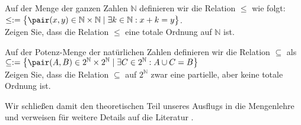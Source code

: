 \exercise
Auf der Menge der ganzen Zahlen $\mathbb{N}$ definieren wir die Relation $\leq$ 
wie folgt: 
\\[0.2cm]
\hspace*{1.3cm}
$\leq := \bigl\{ \pair(x,y) \in \mathbb{N} \times \mathbb{N} \mid \exists k \in \mathbb{N}: x + k = y \bigr\}$.
\\[0.2cm]
Zeigen Sie, dass die Relation $\leq$ eine totale Ordnung auf $\mathbb{N}$ ist.
\exend

\exercise
Auf der Potenz-Menge der nat\"{u}rlichen Zahlen definieren wir die Relation
$\subseteq$ als 
\\[0.2cm]
\hspace*{1.3cm}
$\subseteq := 
\bigl\{ \pair(A,B) \in 2^\mathbb{N} \times 2^\mathbb{N}\mid \exists C \in 2^\mathbb{N}: A \cup C = B \bigr\}$
\\[0.2cm]
Zeigen Sie, dass die Relation $\subseteq$ auf $2^\mathbb{N}$ zwar eine partielle, aber keine
totale Ordnung ist.
\exend
\next

\noindent
Wir schließen damit den theoretischen Teil unseres Ausflugs in die Mengenlehre und verweisen f\"{u}r weitere
Details auf die Literatur \cite{lipschutz:1998}.  

